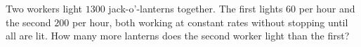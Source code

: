 Two workers light $1300$ jack-o'-lanterns together. The first lights $60$ per hour and the second $200$ per hour, both working at constant rates without stopping until all are lit. How many more lanterns does the second worker light than the first?

